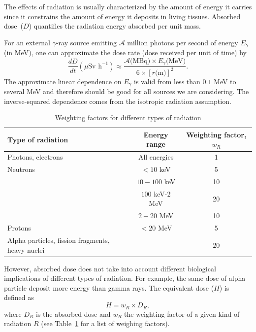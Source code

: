 \documentclass[nofootinbib,preprint,aps]{revtex4-1}
\begin{document}
        The effects of radiation is usually characterized by the amount of energy it carries since it constrains
        the amount of energy it deposits in living tissues.
        Absorbed dose~($D$) quantifies the 
        radiation energy absorbed per unit mass.

        For an external $\gamma$-ray source emitting $\mathcal{A}$ million photons per second 
        of energy $E_{\gamma}$
        (in MeV), one can approximate the dose rate (dose received per unit of time) by \cite[chapt. 7]{l01}
        \begin{equation}
            \frac{dD}{dt}(\mu\text{Sv h}^{-1}) \approx \frac{\mathcal{A}\text{(MBq)}\times E_{\gamma}\text{(MeV)}}
            {6\times [r\text{(m)}]^2}.
        \end{equation}
        The approximate linear dependence on $E_{\gamma}$ is valid from less than $0.1$ MeV to several
        MeV and therefore should be good for all sources we are considering.\cite{my68}
        The inverse-squared dependence comes from the isotropic radiation assumption.

        \begin{table}[h]
            \centering
            \caption{Weighting factors for different types of radiation \cite{icrp74}}
            \begin{ruledtabular}
                \begin{tabular}{l c c}
                Type of radiation & Energy range & Weighting factor, $w_R$\\
                \hline
                Photons, electrons & All energies & 1\\
                Neutrons & $<10$ keV & 5 \\
                         & $10-100$ keV & 10 \\
                         & $100$ keV-$2$ MeV & 20 \\
                         & $2-20$ MeV & 10 \\
                Protons & $<20$ MeV & 5 \\
                Alpha particles, fission fragments, heavy nuclei & & $20$\\
            \end{tabular}
            \label{tab:eq}
            \end{ruledtabular}
        \end{table}
        However, absorbed dose does not take into account different biological implications of different types
        of radiation.
        For example, the same dose of alpha particle deposit more energy than gamma rays. The equivalent
        dose ($H$) is defined as
        \begin{equation}
        H=w_R \times D_R,
        \end{equation}
        where $D_R$ is the absorbed dose and $w_R$ the weighting factor of a given kind of radiation $R$
        (see Table~\ref{tab:eq} for a list of weighing factors).
\end{document}
